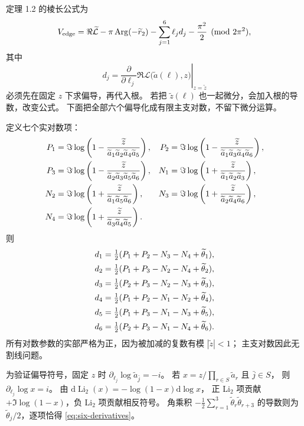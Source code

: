 \documentclass[UTF8,11pt,fontset=none]{ctexart}
\numberwithin{equation}{section}
\theoremstyle{definition}
\DeclareMathOperator{\Li}{Li}
\DeclareMathOperator{\Arg}{Arg}
\newcommand{\dd}{\mathrm d}
\begin{document}
定理 1.2 的棱长公式为
\begin{equation}
 V_{\rm edge}=
 \Re\widetilde{\mathcal L}
 -\pi\Arg(-\widetilde r_2)
 -\sum_{j=1}^6\ell_jd_j-\frac{\pi^2}{2}
 \pmod{2\pi^2},
 \label{eq:edge-volume}
\end{equation}
其中
\begin{equation}
 d_j=
 \left.
 \frac{\partial}{\partial\ell_j}
 \Re\mathcal L\big(\widetilde a(\ell),z\big)
 \right|_{z=\widetilde z}
 \label{eq:fixed-z-derivative}
\end{equation}
必须先在固定 $z$ 下求偏导，再代入根。
若把 $\widetilde z(\ell)$ 也一起微分，会加入根的导数，改变公式。
下面把全部六个偏导化成有限主支对数，不留下微分运算。

定义七个实对数项：
\begin{align}
 P_1&=\Im\log\left(1-\frac{\widetilde z}
 {\widetilde a_1\widetilde a_2\widetilde a_4\widetilde a_5}\right),
 &
 P_2&=\Im\log\left(1-\frac{\widetilde z}
 {\widetilde a_1\widetilde a_3\widetilde a_4\widetilde a_6}\right),
 \notag\\
 P_3&=\Im\log\left(1-\frac{\widetilde z}
 {\widetilde a_2\widetilde a_3\widetilde a_5\widetilde a_6}\right),
 &
 N_1&=\Im\log\left(1+\frac{\widetilde z}
 {\widetilde a_1\widetilde a_2\widetilde a_3}\right),
 \notag\\
 N_2&=\Im\log\left(1+\frac{\widetilde z}
 {\widetilde a_1\widetilde a_5\widetilde a_6}\right),
 &
 N_3&=\Im\log\left(1+\frac{\widetilde z}
 {\widetilde a_2\widetilde a_4\widetilde a_6}\right),
 \notag\\
 N_4&=\Im\log\left(1+\frac{\widetilde z}
 {\widetilde a_3\widetilde a_4\widetilde a_5}\right).
 \label{eq:edge-logs}
\end{align}
则
\begin{align}
 d_1&=\tfrac12(P_1+P_2-N_3-N_4+\widetilde\theta_1),\notag\\
 d_2&=\tfrac12(P_1+P_3-N_2-N_4+\widetilde\theta_2),\notag\\
 d_3&=\tfrac12(P_2+P_3-N_2-N_3+\widetilde\theta_3),\notag\\
 d_4&=\tfrac12(P_1+P_2-N_1-N_2+\widetilde\theta_4),\label{eq:six-derivatives}\\
 d_5&=\tfrac12(P_1+P_3-N_1-N_3+\widetilde\theta_5),\notag\\
 d_6&=\tfrac12(P_2+P_3-N_1-N_4+\widetilde\theta_6).\notag
\end{align}
所有对数参数的实部严格为正，因为被加减的复数有模 $|\widetilde z|<1$；
主支对数因此无割线问题。

为验证偏导符号，固定 $z$ 时
$\partial_{\ell_j}\log\widetilde a_{\bar j}=-i$。
若 $x=z/\prod_{r\in S}\widetilde a_r$ 且 $\bar j\in S$，
则 $\partial_{\ell_j}\log x=i$。
由 $\dd\Li_2(x)=-\log(1-x)\dd\log x$，
正 Li$_2$ 项贡献 $+\Im\log(1-x)$，负 Li$_2$ 项贡献相反符号。
角乘积 $-\frac12\sum_{r=1}^3
\widetilde\theta_r\widetilde\theta_{r+3}$ 的导数则为
$\widetilde\theta_j/2$，逐项恰得 \eqref{eq:six-derivatives}。
\end{document}
